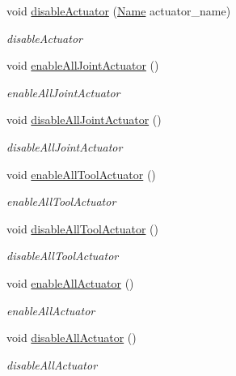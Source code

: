 \begin{DoxyCompactItemize}
void \hyperlink{classrobotis__manipulator_1_1_robotis_manipulator_a45481ddd6bb9203e936e21f9a123ee25}{disable\+Actuator} (\hyperlink{namespacerobotis__manipulator_a08c2d25e77a01ad75b9bb740f8ce4765}{Name} actuator\+\_\+name)
\begin{DoxyCompactList}\small\item\em disable\+Actuator \end{DoxyCompactList}\item 
void \hyperlink{classrobotis__manipulator_1_1_robotis_manipulator_ad0176ec40b940118eccf2b74b4864044}{enable\+All\+Joint\+Actuator} ()
\begin{DoxyCompactList}\small\item\em enable\+All\+Joint\+Actuator \end{DoxyCompactList}\item 
void \hyperlink{classrobotis__manipulator_1_1_robotis_manipulator_ac09e6b56facde00b9eb07eead84091d7}{disable\+All\+Joint\+Actuator} ()
\begin{DoxyCompactList}\small\item\em disable\+All\+Joint\+Actuator \end{DoxyCompactList}\item 
void \hyperlink{classrobotis__manipulator_1_1_robotis_manipulator_a1374268ca98e71fe721d61640ca33114}{enable\+All\+Tool\+Actuator} ()
\begin{DoxyCompactList}\small\item\em enable\+All\+Tool\+Actuator \end{DoxyCompactList}\item 
void \hyperlink{classrobotis__manipulator_1_1_robotis_manipulator_aab20aa14df1e1ce04a82a6f38d0a8740}{disable\+All\+Tool\+Actuator} ()
\begin{DoxyCompactList}\small\item\em disable\+All\+Tool\+Actuator \end{DoxyCompactList}\item 
void \hyperlink{classrobotis__manipulator_1_1_robotis_manipulator_a12deb7fccba0dd37c58bbee691458af6}{enable\+All\+Actuator} ()
\begin{DoxyCompactList}\small\item\em enable\+All\+Actuator \end{DoxyCompactList}\item 
void \hyperlink{classrobotis__manipulator_1_1_robotis_manipulator_a39ddc4fec0ebe31860b6d8c0caa03c70}{disable\+All\+Actuator} ()
\begin{DoxyCompactList}\small\item\em disable\+All\+Actuator \end{DoxyCompactList}\item 

\end{DoxyCompactItemize}
